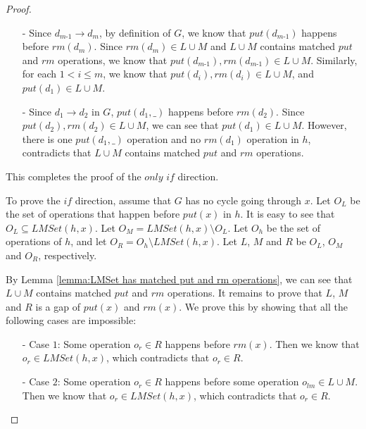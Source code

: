 \documentclass{llncs}
\begin{document}
\begin {proof}
\begin{itemize}
\setlength{\itemsep}{0.5pt}
\item[-] Since $d_{\textit{m-1}} \rightarrow d_m$, by definition of $G$, we know that $\textit{put}(d_{\textit{m-1}})$ happens before $\textit{rm}(d_m)$. Since $\textit{rm}(d_m) \in L \cup M$ and $L \cup M$ contains matched $\textit{put}$ and $\textit{rm}$ operations, we know that $\textit{put}(d_{\textit{m-1}}),\textit{rm}(d_{\textit{m-1}}) \in L \cup M$. Similarly, for each $1 < i \leq m$, we know that $\textit{put}(d_i),\textit{rm}(d_i) \in L \cup M$, and $\textit{put}(d_1)\in L \cup M$.

\item[-] Since $d_1 \rightarrow d_2$ in $G$, $\textit{put}(d_1,\_)$ happens before $\textit{rm}(d_2)$. Since $\textit{put}(d_2),\textit{rm}(d_2) \in L \cup M$, we can see that $\textit{put}(d_1) \in L \cup M$. However, there is one $\textit{put}(d_1,\_)$ operation and no $\textit{rm}(d_1)$ operation in $h$, contradicts that $L \cup M$ contains matched $\textit{put}$ and $\textit{rm}$ operations.
\end{itemize}


This completes the proof of the $\textit{only if}$ direction.

To prove the $\textit{if}$ direction, assume that $G$ has no cycle going through $x$. Let $O_L$ be the set of operations that happen before $\textit{put}(x)$ in $h$. It is easy to see that $O_L \subseteq \textit{LMSet}(h,x)$. Let $O_M = \textit{LMSet}(h,x) \setminus O_L$. Let $O_h$ be the set of operations of $h$, and let $O_R = O_h \setminus \textit{LMSet}(h,x)$. Let $L$, $M$ and $R$ be $O_L$, $O_M$ and $O_R$, respectively.

By Lemma \ref{lemma:LMSet has matched put and rm operations}, we can see that $L \cup M$ contains matched $\textit{put}$ and $\textit{rm}$ operations. It remains to prove that $L$, $M$ and $R$ is a gap of $\textit{put}(x)$ and $\textit{rm}(x)$. We prove this by showing that all the following cases are impossible:

\begin{itemize}
\setlength{\itemsep}{0.5pt}
\item[-] Case $1$: Some operation $o_r \in R$ happens before $\textit{rm}(x)$. Then we know that $o_r \in \textit{LMSet}(h,x)$, which contradicts that $o_r \in R$.

\item[-] Case $2$: Some operation $o_r \in R$ happens before some operation $o_{lm} \in L \cup M$. Then we know that $o_r \in \textit{LMSet}(h,x)$, which contradicts that $o_r \in R$.


\end{itemize}
\end{proof}
\end{document}

